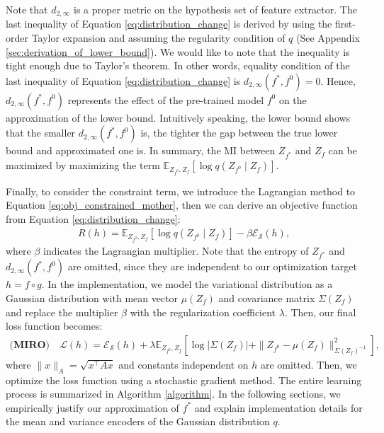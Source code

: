 Note that $d_{2,\infty}$ is a proper metric on the hypothesis set of feature extractor.
The last inequality of Equation \eqref{eq:distribution_change} is derived by using the first-order Taylor expansion and assuming the regularity condition of $q$ (See Appendix \ref{sec:derivation_of_lower_bound}).
We would like to note that the inequality is tight enough due to Taylor's theorem.
In other words, equality condition of the last inequality of Equation \eqref{eq:distribution_change} is $d_{2,\infty}(f^{*}, f^{0})=0$.
Hence, $d_{2,\infty}(f^{*}, f^{0})$ represents the effect of the pre-trained model $f^{0}$ on the approximation of the lower bound.
Intuitively speaking, the lower bound shows that the smaller $d_{2,\infty}(f^{*}, f^{0})$ is, the tighter the gap between the true lower bound and approximated one is.
In summary, the MI between $Z_{f^{*}}$ and $Z_{f}$ can be maximized by maximizing the term $\mathbb{E}_{Z_{f^{0}}, Z_f}[\log q(Z_{f^{0}}\mid Z_f)]$.

Finally, to consider the constraint term, we introduce the Lagrangian method to Equation \eqref{eq:obj_constrained_mother}, then we can derive an objective function from Equation  \eqref{eq:distribution_change}:
\begin{align}
    R(h)=\mathbb{E}_{Z_{f^0}, Z_f}[\log q(Z_{f^0} \mid Z_f)] - \beta \mathcal{E}_{\mathcal S}(h),
\end{align}
where $\beta$ indicates the Lagrangian multiplier.
Note that the entropy of $Z_{f^{*}}$ and $d_{2,\infty}(f^{*},f^{0})$ are omitted, since they are independent to our optimization target $h=f\circ g$.
In the implementation, we model the variational distribution as a Gaussian distribution with mean vector $\mu(Z_{f})$ and covariance matrix $\Sigma(Z_{f})$ and replace the multiplier $\beta$ with the regularization coefficient $\lambda$.
Then, our final loss function becomes:
\begin{align}
    \textbf{(MIRO)} \quad \mathcal L(h) = \mathcal{E}_{\mathcal S}(h) + \lambda \mathbb{E}_{Z_{f^{0}},Z_{f}}\left[ \log \left|\Sigma(Z_{f})\right| + \|Z_{f^{0}}-\mu(Z_{f})\|^{2}_{\Sigma(Z_{f})^{-1}}\right],
    \label{eq:method}
\end{align}
where $\|x\|_{A}=\sqrt{x^{\intercal}A x}$ and constants independent on $h$ are omitted.
Then, we optimize the loss function using  a stochastic gradient method.
The entire learning process is summarized in Algorithm \ref{algorithm}.
In the following sections, we empirically justify our approximation of $f^{*}$ and explain implementation details for the mean and variance encoders of the Gaussian distribution $q$.

